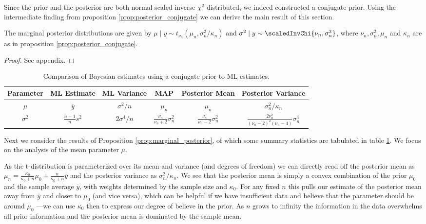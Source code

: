 Since the prior and the posterior are both normal scaled inverse $\chi^2$ distributed, we indeed constructed a conjugate prior.
Using the intermediate finding from proposition \ref{prop:posterior_conjugate} we can derive the main result of this section.

\begin{proposition}\label{prop:marginal_posterior}
  The marginal posterior distributions are given by $\mu \mid y \sim t_{\nu_n}(\mu_n, \sigma_n^2 / \kappa_n)$ and $\sigma^2 \mid y \sim \scaledInvChi{\nu_n, \sigma_n^2}$, where $\nu_n, \sigma_n^2, \mu_n$ and $\kappa_n$ are as in proposition \ref{prop:posterior_conjugate}.
\end{proposition}
\begin{proof}
  See appendix.
\end{proof}

\begin{table}[ht]
\centering
\def\arraystretch{1.3}
{\small
 \begin{tabular}{c | c c c c c}
 Parameter & ML Estimate & ML Variance & MAP & Posterior Mean & Posterior Variance\\
 \hline
 $\mu$ & $\bar{y}$ & $\sigma^2 / n$ & $\mu_n$ & $\mu_n$ & $\sigma_n^2 / \kappa_n$\\
 $\sigma^2$ & $\frac{n-1}{n}s^2$ & $2 \sigma^4 / n$ & $\frac{\nu_n}{\nu_n + 2} \sigma_n^2$ & $\frac{\nu_n}{\nu_n - 2} \sigma_n^2$ & $\frac{2 \nu_n^2}{(\nu_n - 2)^2(\nu_n - 4)} \sigma_n^4$
 \end{tabular}
 }
\caption{{\small Comparison of Bayesian estimates using a conjugate prior to ML estimates.}}
\label{tab:comp_conjugate_bay_ml}
\end{table}

Next we consider the results of Proposition \ref{prop:marginal_posterior}, of which some summary statistics are tabulated in table \ref{tab:comp_conjugate_bay_ml}.
We focus on the analysis of the mean parameter $\mu$.

As the t-distribution is parameterized over its mean and variance (and degrees of freedom) we can directly read off the posterior mean as $\mu_n =\frac{\kappa_0}{\kappa_0 + n}\mu_0 + \frac{n}{\kappa_0 + n}\bar{y}$ and the posterior variance as $\sigma_n^2 / \kappa_n$.
We see that the posterior mean is simply a convex combination of the prior $\mu_0$ and the sample average $\bar{y}$, with weights determined by the sample size and $\kappa_0$.
For any fixed $n$ this pulls our estimate of the posterior mean away from $\bar{y}$ and closer to $\mu_0$ (and vice versa), which can be helpful if we have insufficient data and believe that the parameter should be around $\mu_0$ ---we can use $\kappa_0$ then to express our degree of believe in the prior.
As $n$ grows to infinity the information in the data overwhelms all prior information and the posterior mean is dominated by the sample mean.

